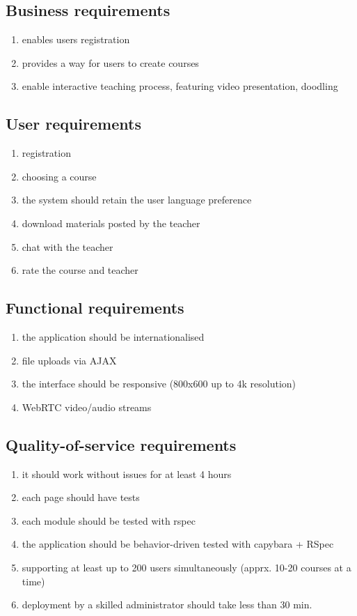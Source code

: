 \subsection{Business requirements}
\begin{enumerate}
\item enables users registration
\item provides a way for users to create courses
\item enable interactive teaching process, featuring video presentation,
doodling
\end{enumerate}

\subsection{User requirements}
\begin{enumerate}
\item registration
\item choosing a course
\item the system should retain the user language preference
\item download materials posted by the teacher
\item chat with the teacher
\item rate the course and teacher
\end{enumerate}

\subsection{Functional requirements}
\begin{enumerate}
\item the application should be internationalised
\item file uploads via AJAX
\item the interface should be responsive (800x600 up to 4k resolution)
\item WebRTC video/audio streams
\end{enumerate}

\subsection{Quality-of-service requirements}
\begin{enumerate}
\item it should work without issues for at least 4 hours
\item each page should have tests
\item each module should be tested with rspec
\item the application should be behavior-driven tested with capybara + RSpec
\item supporting at least up to 200 users simultaneously (apprx. 10-20 courses
at a time)
\item deployment by a skilled administrator should take less than 30 min.
\end{enumerate}

